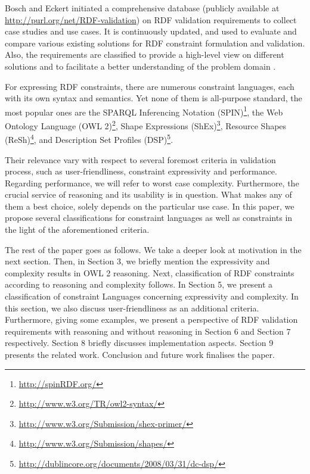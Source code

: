 \documentclass{llncs}
\begin{document}
Bosch and Eckert \cite{BoschEckert2014} initiated a comprehensive database  (publicly available at \url{http://purl.org/net/RDF-validation})  on RDF validation requirements to collect case studies and use cases. It is continuously updated, and used to evaluate and compare various existing solutions for RDF constraint formulation and validation. 
Also, the requirements are classified to provide a high-level view on different solutions and to facilitate a better understanding of the problem domain \cite{BoschEckert2014}.  

For expressing RDF constraints, there are numerous constraint languages, each with its own syntax and semantics.  
Yet none of them is all-purpose standard, the most popular ones are
the SPARQL Inferencing Notation (SPIN)\footnote{\url{http://spinRDF.org/}}, 
the Web Ontology Language (OWL 2)\footnote{\url{http://www.w3.org/TR/owl2-syntax/}}, 
Shape Expressions (ShEx)\footnote{\url{http://www.w3.org/Submission/shex-primer/}}, 
Resource Shapes (ReSh)\footnote{\url{http://www.w3.org/Submission/shapes/}}, 
and Description Set Profiles (DSP)\footnote{\url{http://dublincore.org/documents/2008/03/31/dc-dsp/}}.


Their relevance vary with respect to several foremost criteria in validation process, such as user-friendliness, constraint expressivity and performance.  Regarding performance, we will refer to worst case complexity. Furthermore, the crucial service of reasoning and its usability is in question. What makes any of them a best choice, solely depends on the  particular use case. In this paper, we propose several  classifications for constraint languages as well as constraints in the light of the aforementioned criteria.

The rest of the paper goes as follows. We take a deeper look at motivation in the next section. Then, in Section 3, we briefly mention the expressivity and complexity results in OWL 2 reasoning. Next, classification of RDF constraints according to reasoning and complexity follows.  In Section 5, we present a classification of constraint Languages concerning expressivity and complexity. In this section, we also discuss user-friendliness as an additional criteria. Furthermore, giving some examples, we present a perspective of RDF validation requirements with reasoning and without reasoning in Section 6 and Section 7 respectively. Section 8 briefly discusses implementation aspects. Section 9 presents the related work. Conclusion and future work finalises the paper.
\end{document}

